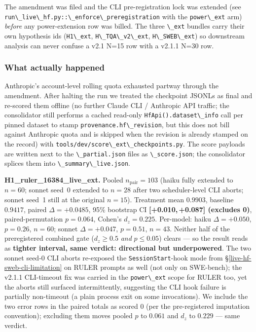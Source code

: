 The amendment was filed and the CLI pre-registration lock was
extended (see \passthrough{\lstinline!run\_live\_hf.py::\_enforce\_preregistration!}
with the \passthrough{\lstinline!power\_ext!} arm) \emph{before}
any power-extension row was billed. The three \passthrough{\lstinline!\_ext!}
bundles carry their own hypothesis ids (\passthrough{\lstinline!H1\_ext!},
\passthrough{\lstinline!H\_TQA\_v2\_ext!}, \passthrough{\lstinline!H\_SWEB\_ext!})
so downstream analysis can never confuse a v2.1 N=15 row with a
v2.1.1 N=30 row.

\subsubsection{What actually happened}

Anthropic's account-level rolling quota exhausted partway through the
amendment. After halting the run we treated the checkpoint JSONLs as
final and re-scored them offline (no further Claude CLI / Anthropic
API traffic; the consolidator still performs a cached read-only
\passthrough{\lstinline!HfApi().dataset\_info!} call per pinned
dataset to stamp \passthrough{\lstinline!provenance.hf\_revision!},
but this does not bill against Anthropic quota and is skipped when
the revision is already stamped on the record) with
\passthrough{\lstinline!tools/dev/score\_ext\_checkpoints.py!}. The
score payloads are written next to the \passthrough{\lstinline!\_partial.json!}
files as \passthrough{\lstinline!\_score.json!}; the consolidator
splices them into \passthrough{\lstinline!\_summary\_live.json!}.

\textbf{H1\_ruler\_16384\_live\_ext.} Pooled $n_\text{pair}=103$
(haiku fully extended to $n=60$; sonnet seed~0 extended to $n=28$
after two scheduler-level CLI aborts; sonnet seed~1 still at the
original $n=15$). Treatment mean $0.9903$, baseline $0.9417$,
paired $\Delta=+0.0485$, 95\% bootstrap CI \textbf{[+0.010,\,+0.087]
(excludes 0)}, paired-permutation $p=0.064$, Cohen's $d_z=0.225$.
Per-model: haiku $\Delta=+0.050$, $p=0.26$, $n=60$; sonnet
$\Delta=+0.047$, $p=0.51$, $n=43$. Neither half of the preregistered combined gate
($d_z \ge 0.5$ \emph{and} $p \le 0.05$) clears --- so the result
reads as \textbf{tighter interval, same verdict: directional but
underpowered}. The two sonnet seed-0 CLI aborts re-exposed the
\passthrough{\lstinline!SessionStart!}-hook mode from
\S\ref{live-hf-sweb-cli-limitation} on RULER prompts as well
(not only on SWE-bench); the v2.1.1 CLI-timeout fix was carried in
the \passthrough{\lstinline!power\_ext!} scope for RULER too, yet
the aborts still surfaced intermittently, suggesting the CLI hook
failure is partially non-timeout (a plain process exit on some
invocations). We include the two error rows in the paired totals
as scored 0 (per the pre-registered imputation convention); excluding
them moves pooled $p$ to $0.061$ and $d_z$ to $0.229$ --- same
verdict.

